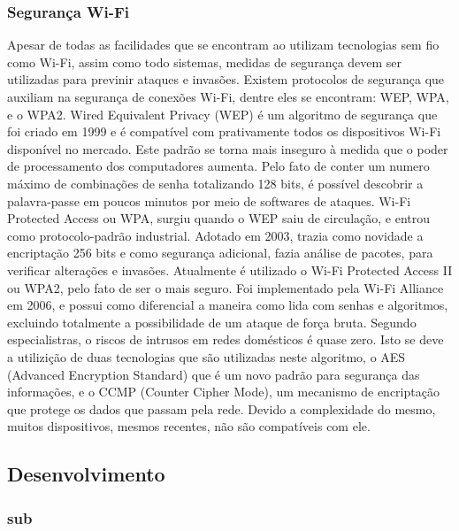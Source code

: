 \documentclass[journal]{IEEEtran}
\begin{document}
\subsubsection{Segurança Wi-Fi}

Apesar de todas as facilidades que se encontram ao utilizam tecnologias sem fio como Wi-Fi, assim como todo sistemas, medidas de segurança devem ser utilizadas para previnir ataques e invasões. Existem protocolos de segurança que auxiliam na segurança de conexões Wi-Fi, dentre eles se encontram: WEP, WPA, e o WPA2. Wired Equivalent Privacy (WEP) é um algoritmo de segurança que foi criado em 1999 e é compatível com prativamente todos os dispositivos Wi-Fi disponível no mercado. Este padrão se torna mais inseguro à medida que o poder de processamento dos computadores aumenta. Pelo fato de conter um numero máximo de combinações de senha totalizando 128 bits, é possível descobrir a palavra-passe em poucos minutos por meio de softwares de ataques. Wi-Fi Protected Access ou WPA, surgiu quando o WEP saiu de circulação, e entrou como protocolo-padrão industrial. Adotado em 2003, trazia como novidade a encriptação 256 bits e como segurança adicional, fazia análise de pacotes, para verificar alterações e invasões. Atualmente é utilizado o Wi-Fi Protected Access II ou WPA2, pelo fato de ser o mais seguro. Foi implementado pela Wi-Fi Alliance em 2006, e possui como diferencial a maneira como lida com senhas e algoritmos, excluindo totalmente a possibilidade de um ataque de força bruta. Segundo especialistras, o riscos de intrusos em redes domésticos é quase zero. Isto se deve a utilizição de duas tecnologias que são utilizadas neste algoritmo, o AES (Advanced Encryption Standard) que é um novo padrão para segurança das informações, e o CCMP (Counter Cipher Mode), um mecanismo de encriptação que protege os dados que passam pela rede. Devido a complexidade do mesmo, muitos dispositivos, mesmos recentes, não são compatíveis com ele. \cite{wifitecmundo}








\subsection{Desenvolvimento}
\subsubsection{sub}
\end{document}
